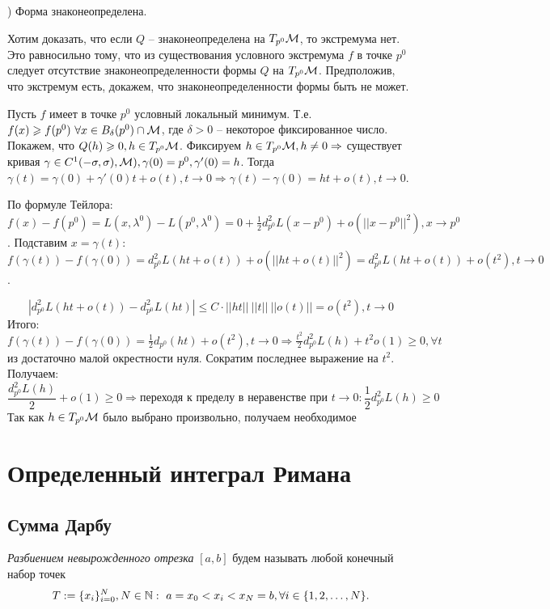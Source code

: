 
) Форма знаконеопределена. 

\noindent Хотим доказать, что если $Q$ -- знаконеопределена на $T_{p^0} \mathcal{M}$, то экстремума нет. Это равносильно тому, что из существования условного экстремума $f$ в точке $p^0$ следует отсутствие знаконеопределенности формы $Q$ на $T_{p^0} \mathcal{M}$. Предположив, что экстремум есть, докажем, что знаконеопределенности формы быть не может. 

\noindent Пусть $f$ имеет в точке $p^0$ условный локальный минимум. Т.е. $f(x) \geqslant f(p^0) \ \forall x \in B_{\delta}(p^0) \cap \mathcal{M}$, где $\delta > 0$ -- некоторое фиксированное число. Покажем, что $Q(h) \geqslant 0, h \in T_{p^0} \mathcal{M}$. Фиксируем $h \in T_{p^0} \mathcal{M}, h \neq 0 \Rightarrow$ существует кривая $\gamma \in C^1(-\sigma, \sigma), \mathcal{M}), \gamma(0) = p^0, \gamma'(0) = h$. Тогда $\gamma(t) = \gamma(0) + \gamma'(0)t + o(t), t \rightarrow 0 \Rightarrow \gamma(t) - \gamma(0) = ht + o(t), t \rightarrow 0$. 

\noindent По формуле Тейлора: $f(x) - f(p^0) = L(x, \lambda^0) - L(p^0, \lambda^0) = 0 + \frac{1}{2}d^2_{p^0}L(x - p^0) + o(||x - p^0||^2), x \rightarrow p^0$. Подставим $x = \gamma(t): $  $f(\gamma(t)) - f(\gamma(0)) = d^2_{p^0}L(ht + o(t)) + o(||ht + o(t)||^2) = d^2_{p^0}L(ht + o(t)) + o(t^2), t \rightarrow 0$. 

$$|d^2_{p^0}L(ht + o(t)) - d^2_{p^0}L(ht)| \le C \cdot ||ht|| \ ||t|| \ ||o(t)|| = o(t^2), t \rightarrow 0$$
Итого: $f(\gamma(t)) - f(\gamma(0)) = \frac{1}{2}d_{p^0}(ht) + o(t^2), t \rightarrow 0 \Rightarrow \frac{t^2}{2}d^2_{p^0} L(h) + t^2o(1) \ge 0, \forall t$ из достаточно малой окрестности нуля. Сократим последнее выражение на $t^2$. Получаем: 
$$
\dfrac{d^2_{p^0}L(h)}{2} + o(1) \ge 0 \Rightarrow \text{переходя к пределу в неравенстве при } t \rightarrow 0: \dfrac{1}{2}d^2_{p^0}L(h) \ge 0 
$$
Так как $h \in T_{p^0} \mathcal{M} $ было выбрано произвольно, получаем необходимое


\newpage
\section{Определенный интеграл Римана}

\subsection {Сумма Дарбу}
\begin{definition}
    \textit{Разбиением невырожденного отрезка} $[a, b]$ будем называть любой конечный набор точек $$T := \{x_i\}_{i = 0}^N, N \in \mathbb{N} : \ a = x_0 < x_i < x_N = b, \forall i \in \{ 1, 2, \ldots, N\}.$$
\end{definition}

